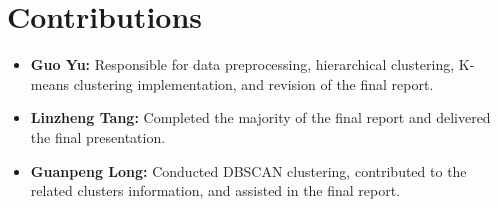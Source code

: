 \documentclass{article}
\begin{document}
\section{Contributions}
\begin{itemize}
    \item \textbf{Guo Yu:} Responsible for data preprocessing, hierarchical clustering, K-means clustering implementation, and revision of the final report.

    \item \textbf{Linzheng Tang:} Completed the majority of the final report and delivered the final presentation.

    \item \textbf{Guanpeng Long:} Conducted DBSCAN clustering, contributed to the related clusters information, and assisted in the final report.
\end{itemize}

{
\small

}
\end{document}
